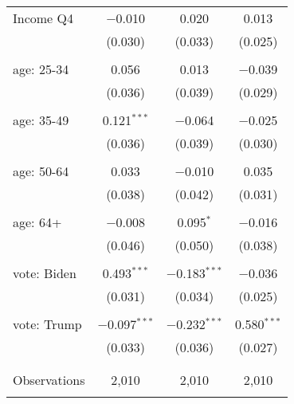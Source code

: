 \begin{tabular}{@{\extracolsep{5pt}}lccc}
 Income Q4 & $-$0.010 & 0.020 & 0.013 \\ 
  & (0.030) & (0.033) & (0.025) \\ 
  & & & \\ 
 age: 25-34 & 0.056 & 0.013 & $-$0.039 \\ 
  & (0.036) & (0.039) & (0.029) \\ 
  & & & \\ 
 age: 35-49 & 0.121$^{***}$ & $-$0.064 & $-$0.025 \\ 
  & (0.036) & (0.039) & (0.030) \\ 
  & & & \\ 
 age: 50-64 & 0.033 & $-$0.010 & 0.035 \\ 
  & (0.038) & (0.042) & (0.031) \\ 
  & & & \\ 
 age: 64+ & $-$0.008 & 0.095$^{*}$ & $-$0.016 \\ 
  & (0.046) & (0.050) & (0.038) \\ 
  & & & \\ 
 vote: Biden & 0.493$^{***}$ & $-$0.183$^{***}$ & $-$0.036 \\ 
  & (0.031) & (0.034) & (0.025) \\ 
  & & & \\ 
 vote: Trump & $-$0.097$^{***}$ & $-$0.232$^{***}$ & 0.580$^{***}$ \\ 
  & (0.033) & (0.036) & (0.027) \\ 
  & & & \\ 
\hline \\[-1.8ex] 

Observations & 2,010 & 2,010 & 2,010 \\ 
\hline 
\hline \\[-1.8ex] 
\end{tabular} 